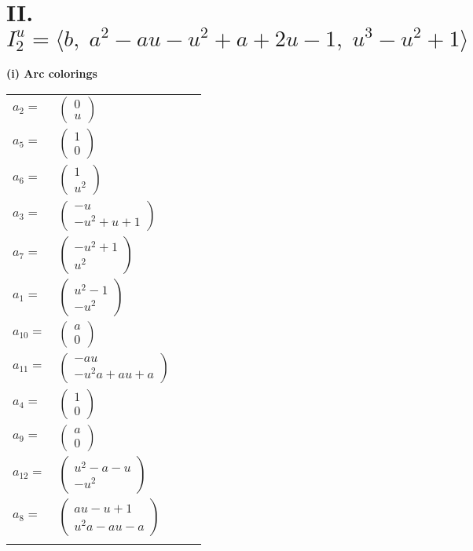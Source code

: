 \documentclass[1p]{elsarticle_modified}
\theoremstyle{definition}
\begin{document}
\centering \section*{II. $I^u_{2}= \langle b,\;a^2- a u- u^2+a+2 u-1,\;u^3- u^2+1 \rangle$}
\flushleft \textbf{(i) Arc colorings}\\
\begin{tabular}{m{7pt} m{180pt} m{7pt} m{180pt} }
\flushright $a_{2}=$&$\begin{pmatrix}0\\u\end{pmatrix}$ \\
\flushright $a_{5}=$&$\begin{pmatrix}1\\0\end{pmatrix}$ \\
\flushright $a_{6}=$&$\begin{pmatrix}1\\u^2\end{pmatrix}$ \\
\flushright $a_{3}=$&$\begin{pmatrix}- u\\- u^2+u+1\end{pmatrix}$ \\
\flushright $a_{7}=$&$\begin{pmatrix}- u^2+1\\u^2\end{pmatrix}$ \\
\flushright $a_{1}=$&$\begin{pmatrix}u^2-1\\- u^2\end{pmatrix}$ \\
\flushright $a_{10}=$&$\begin{pmatrix}a\\0\end{pmatrix}$ \\
\flushright $a_{11}=$&$\begin{pmatrix}- a u\\- u^2 a+a u+a\end{pmatrix}$ \\
\flushright $a_{4}=$&$\begin{pmatrix}1\\0\end{pmatrix}$ \\
\flushright $a_{9}=$&$\begin{pmatrix}a\\0\end{pmatrix}$ \\
\flushright $a_{12}=$&$\begin{pmatrix}u^2- a- u\\- u^2\end{pmatrix}$ \\
\flushright $a_{8}=$&$\begin{pmatrix}a u- u+1\\u^2 a- a u- a\end{pmatrix}$\\&\end{tabular}
\end{document}
